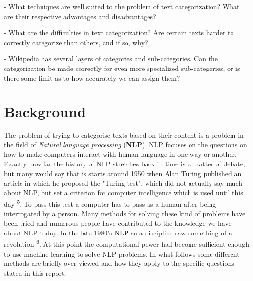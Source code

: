 \documentclass[a4paper]{article}
\begin{document}
\vspace{3mm}

- What techniques are well suited to the problem of text categorization? What are their respective advantages and disadvantages?

\vspace{3mm}

- What are the difficulties in text categorization? Are certain texts harder to correctly categorize than others, and if so, why?

\vspace{3mm}

- Wikipedia has several layers of categories and sub-categories. Can the categorization be made correctly for even more specialized sub-categories, or is there some limit as to how accurately we can assign them?


\vspace{3mm}


\section{Background}

\vspace{3mm}

The problem of trying to categorise texts based on their content is a problem in the field of \textit{Natural language processing} (\textbf{NLP}). NLP focuses on the questions on how to make computers interact with human language in one way or another.\\

Exactly how far the history of NLP stretches back in time is a matter of debate, but many would say that is starts around 1950 when Alan Turing published an article in which he proposed the "Turing test", which did not actually say much about NLP, but set a criterion for computer intelligence which is used until this day \textsuperscript{5}. To pass this test a computer has to pass as a human after being interrogated by a person. Many methods for solving these kind of problems have been tried and numerous people have contributed to the knowledge we have about NLP today. In the late 1980's NLP as a discipline saw something of a revolution \textsuperscript{6}. At this point the computational power had become sufficient enough to use machine learning to solve NLP problems. In what follows some different methods are briefly over-viewed and how they apply to the specific questions stated in this report.\\
\end{document}
